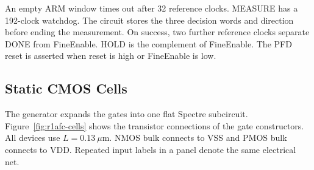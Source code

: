 An empty ARM window times out after 32 reference clocks. MEASURE has
a 192-clock watchdog. The circuit stores the three decision words and
direction before ending the measurement. On success, two further
reference clocks separate DONE from FineEnable. HOLD is the complement
of FineEnable. The PFD reset is asserted when reset is high or FineEnable
is low.

\subsection{Static CMOS Cells}
The generator expands the gates into one flat Spectre subcircuit.
Figure~\ref{fig:r1afc-cells} shows the transistor connections of the
gate constructors. All devices use $L=0.13~\mu\mathrm{m}$. NMOS bulk
connects to VSS and PMOS bulk connects to VDD. Repeated
input labels in a panel denote the same electrical net.



